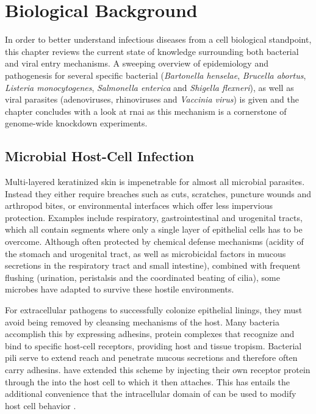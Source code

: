 \chapter{Biological Background}

In order to better understand infectious diseases from a cell biological standpoint, this chapter reviews the current state of knowledge surrounding both bacterial and viral entry mechanisms. A sweeping overview of epidemiology and pathogenesis for several specific bacterial (\textit{Bartonella henselae}, \textit{Brucella abortus}, \textit{Listeria monocytogenes}, \textit{Salmonella enterica} and \textit{Shigella flexneri}), as well as viral parasites (adenoviruses, rhinoviruses and \textit{Vaccinia virus}) is given and the chapter concludes with a look at \acrlong{rnai} as this mechanism is a cornerstone of genome-wide knockdown experiments.

\section{Microbial Host-Cell Infection}

Multi-layered keratinized skin is impenetrable for almost all microbial parasites. Instead they either require breaches such as cuts, scratches, puncture wounds and arthropod bites, or environmental interfaces which offer less impervious protection. Examples include respiratory, gastrointestinal and urogenital tracts, which all contain segments where only a single layer of epithelial cells has to be overcome. Although often protected by chemical defense mechanisms (acidity of the stomach and urogenital tract, as well as microbicidal factors in mucous secretions in the respiratory tract and small intestine), combined with frequent flushing (urination, peristalsis and the coordinated beating of cilia), some microbes have adapted to survive these hostile environments.

For extracellular pathogens to successfully colonize epithelial linings, they must avoid being removed by cleansing mechanisms of the host. Many bacteria accomplish this by expressing adhesins, protein complexes that recognize and bind to specific host-cell receptors, providing host and tissue tropism. Bacterial pili serve to extend reach and penetrate mucous secretions and therefore often carry adhesins.  have extended this scheme by injecting their own receptor protein  through the  into the host cell to which it then attaches. This has entails the additional convenience that the intracellular domain of  can be used to modify host cell behavior \citep{Alberts2008}.

